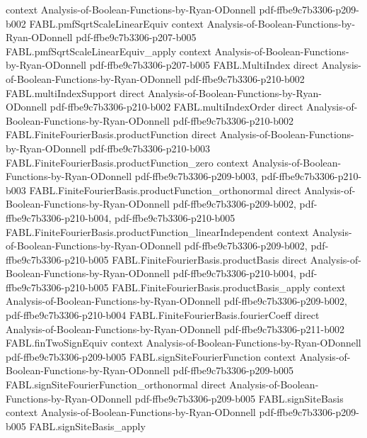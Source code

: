 \begin{theorem}
  {context}
  {Analysis-of-Boolean-Functions-by-Ryan-ODonnell}
  {pdf-ffbe9c7b3306-p209-b002}
\proofstep
  {FABL.pmfSqrtScaleLinearEquiv}
  {context}
  {Analysis-of-Boolean-Functions-by-Ryan-ODonnell}
  {pdf-ffbe9c7b3306-p207-b005}
\proofstep
  {FABL.pmfSqrtScaleLinearEquiv_apply}
  {context}
  {Analysis-of-Boolean-Functions-by-Ryan-ODonnell}
  {pdf-ffbe9c7b3306-p207-b005}
\proofstep
  {FABL.MultiIndex}
  {direct}
  {Analysis-of-Boolean-Functions-by-Ryan-ODonnell}
  {pdf-ffbe9c7b3306-p210-b002}
\proofstep
  {FABL.multiIndexSupport}
  {direct}
  {Analysis-of-Boolean-Functions-by-Ryan-ODonnell}
  {pdf-ffbe9c7b3306-p210-b002}
\proofstep
  {FABL.multiIndexOrder}
  {direct}
  {Analysis-of-Boolean-Functions-by-Ryan-ODonnell}
  {pdf-ffbe9c7b3306-p210-b002}
\proofstep
  {FABL.FiniteFourierBasis.productFunction}
  {direct}
  {Analysis-of-Boolean-Functions-by-Ryan-ODonnell}
  {pdf-ffbe9c7b3306-p210-b003}
\proofstep
  {FABL.FiniteFourierBasis.productFunction_zero}
  {context}
  {Analysis-of-Boolean-Functions-by-Ryan-ODonnell}
  {pdf-ffbe9c7b3306-p209-b003,
    pdf-ffbe9c7b3306-p210-b003}
\proofstep
  {FABL.FiniteFourierBasis.productFunction_orthonormal}
  {direct}
  {Analysis-of-Boolean-Functions-by-Ryan-ODonnell}
  {pdf-ffbe9c7b3306-p209-b002,
    pdf-ffbe9c7b3306-p210-b004,
    pdf-ffbe9c7b3306-p210-b005}
\proofstep
  {FABL.FiniteFourierBasis.productFunction_linearIndependent}
  {context}
  {Analysis-of-Boolean-Functions-by-Ryan-ODonnell}
  {pdf-ffbe9c7b3306-p209-b002,
    pdf-ffbe9c7b3306-p210-b005}
\proofstep
  {FABL.FiniteFourierBasis.productBasis}
  {direct}
  {Analysis-of-Boolean-Functions-by-Ryan-ODonnell}
  {pdf-ffbe9c7b3306-p210-b004,
    pdf-ffbe9c7b3306-p210-b005}
\proofstep
  {FABL.FiniteFourierBasis.productBasis_apply}
  {context}
  {Analysis-of-Boolean-Functions-by-Ryan-ODonnell}
  {pdf-ffbe9c7b3306-p209-b002,
    pdf-ffbe9c7b3306-p210-b004}
\proofstep
  {FABL.FiniteFourierBasis.fourierCoeff}
  {direct}
  {Analysis-of-Boolean-Functions-by-Ryan-ODonnell}
  {pdf-ffbe9c7b3306-p211-b002}
\proofstep
  {FABL.finTwoSignEquiv}
  {context}
  {Analysis-of-Boolean-Functions-by-Ryan-ODonnell}
  {pdf-ffbe9c7b3306-p209-b005}
\proofstep
  {FABL.signSiteFourierFunction}
  {context}
  {Analysis-of-Boolean-Functions-by-Ryan-ODonnell}
  {pdf-ffbe9c7b3306-p209-b005}
\proofstep
  {FABL.signSiteFourierFunction_orthonormal}
  {direct}
  {Analysis-of-Boolean-Functions-by-Ryan-ODonnell}
  {pdf-ffbe9c7b3306-p209-b005}
\proofstep
  {FABL.signSiteBasis}
  {context}
  {Analysis-of-Boolean-Functions-by-Ryan-ODonnell}
  {pdf-ffbe9c7b3306-p209-b005}
\proofstep
  {FABL.signSiteBasis_apply}

\end{theorem}
